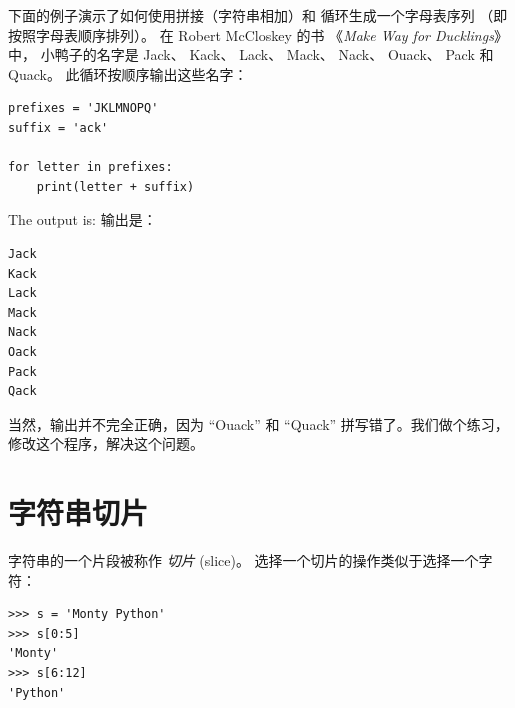 
下面的例子演示了如何使用拼接（字符串相加）和  循环生成一个字母表序列 （即按照字母表顺序排列）。 在 Robert McCloskey 的书 《{\em Make Way for Ducklings}》 中， 小鸭子的名字是 Jack、 Kack、 Lack、 Mack、 Nack、 Ouack、 Pack 和 Quack。 此循环按顺序输出这些名字：

\begin{lstlisting}
prefixes = 'JKLMNOPQ'
suffix = 'ack'

for letter in prefixes:
    print(letter + suffix)
\end{lstlisting}

%
The output is:
输出是：

\begin{lstlisting}
Jack
Kack
Lack
Mack
Nack
Oack
Pack
Qack
\end{lstlisting}

%

当然，输出并不完全正确，因为 ``Ouack'' 和 ``Quack'' 拼写错了。我们做个练习， 修改这个程序，解决这个问题。


\section{字符串切片}
\label{slice}
  
 


字符串的一个片段被称作 {\em 切片} (slice)。 选择一个切片的操作类似于选择一个字符：

\begin{lstlisting}
>>> s = 'Monty Python'
>>> s[0:5]
'Monty'
>>> s[6:12]
'Python'
\end{lstlisting}

